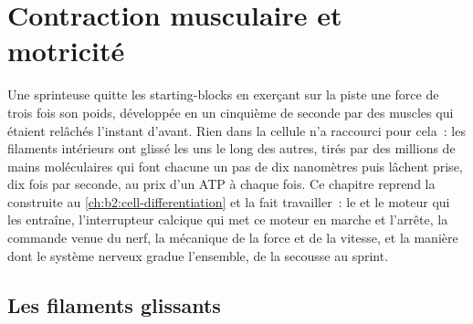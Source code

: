 \chapter{Contraction musculaire et motricité}\label{ch:b2:muscle-movement}

Une sprinteuse quitte les starting-blocks en exerçant sur la piste une
force de trois fois son poids, développée en un cinquième de seconde par
des muscles qui étaient relâchés l'instant d'avant. Rien dans la cellule
n'a raccourci pour cela~: les filaments intérieurs ont glissé les uns le
long des autres, tirés par des millions de mains moléculaires qui font
chacune un pas de dix nanomètres puis lâchent prise, dix fois par
seconde, au prix d'un ATP à chaque fois. Ce chapitre reprend la  construite au \cref{ch:b2:cell-differentiation}
et la fait travailler~: le  et le moteur qui les
entraîne, l'interrupteur calcique qui met ce moteur en marche et
l'arrête, la commande venue du nerf, la mécanique de la force et de la
vitesse, et la manière dont le système nerveux gradue l'ensemble, de la
secousse au sprint.

\section{Les filaments glissants}

